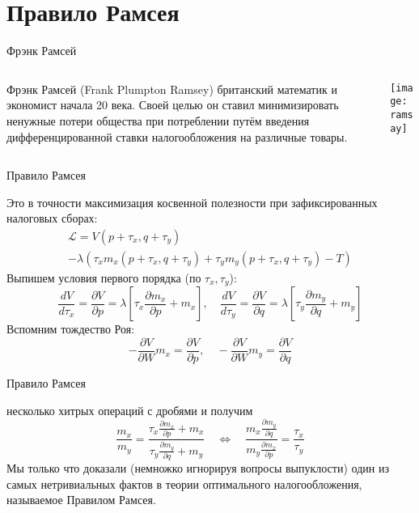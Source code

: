 \documentclass{beamer}
\begin{document}
\section{Правило Рамсея}

\begin{frame}{Фрэнк Рамсей}
\begin{columns}
\begin{column}{0.5\textwidth}
   \alert{Фрэнк Рамсей} (Frank Plumpton Ramsey) британский математик и экономист начала 20 века. Своей целью он ставил \alert{минимизировать ненужные потери общества} при потреблении путём введения \alert{дифференцированной ставки налогообложения} на различные товары. 
\end{column}
\begin{column}{0.5\textwidth}  %
    \begin{center}
     \texttt{[image: ramsay]}
     \end{center}
\end{column}
\end{columns}
\end{frame}

\begin{frame}{Правило Рамсея}

Это в точности максимизация косвенной полезности при зафиксированных налоговых сборах:
\begin{gather*}
\mathcal{L} = V(p+\tau_x,q+\tau_y) \\ - \lambda (\tau_x m_x(p+ \tau_x,q+\tau_y) + \tau_y m_y(p+ \tau_x,q+\tau_y) - T)
\end{gather*}
Выпишем условия первого порядка (по $\tau_x, \tau_y$):
$$\frac{d V}{d \tau_x} = \frac{\partial V}{\partial p} = \lambda [\tau_x \frac{\partial m_x}{\partial p} + m_x], \quad \frac{d V}{d \tau_y} = \frac{\partial V}{\partial q} = \lambda [\tau_y \frac{\partial m_y}{\partial q}+m_y]$$
Вспомним тождество Роя:
$$-\frac{\partial V}{\partial W}m_x = \frac{\partial V}{\partial p}, \quad -\frac{\partial V}{\partial W}m_y = \frac{\partial V}{\partial q}$$
\end{frame}

\begin{frame}{Правило Рамсея}

несколько хитрых операций с дробями и получим
$$ \frac{m_x}{m_y} = \frac{\tau_x \frac{\partial m_x}{\partial p} + m_x}{\tau_y \frac{\partial m_y}{\partial q}+m_y} \quad \Leftrightarrow \quad \frac{m_x \frac{\partial m_y}{\partial q}}{m_y \frac{\partial m_x}{\partial p}} = \frac{\tau_x}{\tau_y}$$
Мы только что доказали (немножко игнорируя вопросы выпуклости) один из самых нетривиальных фактов в теории оптимального налогообложения, называемое Правилом Рамсея.

\end{frame}
\end{document}
